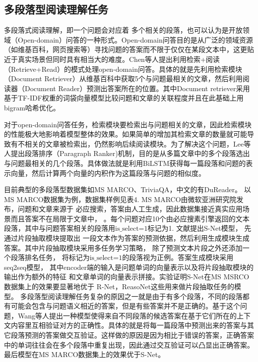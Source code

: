\subsection{多段落型阅读理解任务}
多段落式阅读理解，即一个问题会对应着
多个相关的段落，也可以认为是开放领域（Open-domain）问答的一种形式。Open-domain问答目的是从广泛的领域资源（如维基百科，网页搜索等）寻找问题的答案而不限于仅仅在某段文本中，这更贴近于真实场景但同时具有相当大的难度。Chen等人提出利用检索+阅读（Retrieve+Read）的模式处理open-domain问答。具体的就是先利用检索模块（Document Retriever）从维基百科中获取5个与问题最相关的文章，然后利用阅读器（Document Reader）预测出答案所在的位置。其中Document retriever采用基于TF-IDF权重的词袋向量模型比较问题和文章的关联程度并且在此基础上用bigram哈希优化。

对于open-domain问答任务，检索模块要检索出与问题相关的文章，因此检索模块的性能极大地影响着模型整体的效果。如果简单的增加其检索文章的数量就可能导致有不相关的文章被检索出，仍然影响后续阅读模块。为了解决这个问题，Lee等人提出段落排序（Paragraph Ranker)机制，目的是从多篇文章中的多个段落选出与问题最相关的几个段落。具体做法就是利用BiLSTM获得每一篇段落和问题的表示向量，然后计算两个向量的内积作为这篇段落与问题的相似度。



目前典型的多段落型数据集如MS MARCO、TriviaQA，中文的有DuReader。
以MS MARCO数据集为例，数据集样例见表4. MS MARCO由微软亚洲研究院发布，问题和文章来源于
必应搜索，答案由人工生成，因此数据集接近真实应用场景而且答案不在局限于文章中，
。每个问题对应10个由必应搜素引擎返回的文本段落，其中与问题答案相关的段落用$\text{is\_select=1}$标记为1.
文献\cite{SNet}提出S-Net模型，
先通过片段抽取模块提取出
一段文本作为答案的预测依据，然后利用生成模块生成答案。其中片段抽取模块采用多任务学习策略，
除了预测文本片段之外还添加一个段落排名任务，
将标记为$\text{is\_select=1}$的段落视为正例。答案生成模块采用seq2seq模型，
其中encoder端的输入是问题单词的向量表示以及将片段抽取模块的输出作为额外的特征
和文章单词的向量表示拼接。实验证明S-Net在MS MSRCO数据集上的效果要显著地优于
R-Net，ReasoNet这些用来做片段抽取任务的模型。
多段落型阅读理解任务复杂的原因之一就是由于有多个段落，不同的段落都有可能会包含与问题语义相近的答案，但是有些答案并不是正确的。基于这个问题，Wang等人提出一种模型使得来自不同段落的候选答案在基于它们所在的上下文内容里互相验证对方的正确性。具体的就是将每一篇段落中预测出来的答案与其它段落预测的答案做交互验证。这样做的原因是因为相比于错误的答案，正确答案中的单词往往会在多个段落中重复出现，因此通过交互验证可以凸显出正确答案。最后模型在MS MARCO数据集上的效果优于S-Net。


